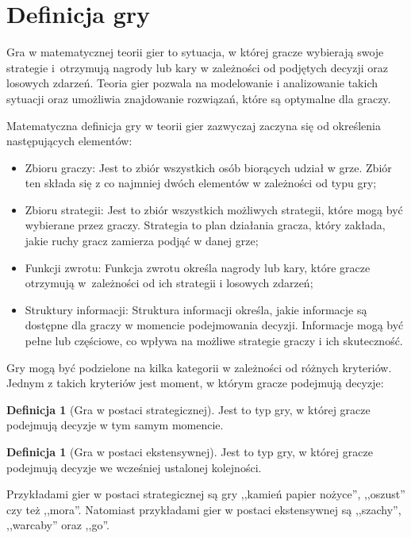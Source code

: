\documentclass[inzynierska]{pwr_wmat_praca_dyplomowa}
\theoremstyle{plain}
\numberwithin{theorem}{chapter}
\theoremstyle{definition}
\numberwithin{theorem}{chapter}
\newtheorem{definition}[theorem]{Definicja}
\begin{document}
\section{Definicja gry}
Gra w matematycznej teorii gier to sytuacja, w której gracze wybierają swoje strategie i~otrzymują nagrody lub kary w zależności od podjętych decyzji  oraz losowych zdarzeń. Teoria gier pozwala na modelowanie i analizowanie takich sytuacji oraz umożliwia znajdowanie rozwiązań, które są optymalne dla graczy.

Matematyczna definicja gry w teorii gier zazwyczaj zaczyna się od określenia następujących elementów:
\begin{itemize}
	\item Zbioru graczy: Jest to zbiór wszystkich osób biorących udział w grze. Zbiór ten składa się z co najmniej dwóch elementów w zależności od typu gry;
	
	\item Zbioru strategii: Jest to zbiór wszystkich możliwych strategii, które mogą być wybierane przez graczy. Strategia to plan działania gracza, który zakłada, jakie ruchy gracz zamierza podjąć w danej grze;
	
	\item Funkcji zwrotu: Funkcja zwrotu określa nagrody lub kary, które gracze otrzymują w~zależności od ich strategii i losowych zdarzeń;
	
	\item Struktury informacji: Struktura informacji określa, jakie informacje są dostępne dla graczy w momencie podejmowania decyzji. Informacje mogą być pełne lub częściowe, co wpływa na możliwe strategie graczy i ich skuteczność.
\end{itemize}

Gry mogą być podzielone na kilka kategorii w zależności od różnych kryteriów. Jednym z takich kryteriów jest moment, w którym gracze podejmują decyzje:

\begin{definition}[Gra w postaci strategicznej]
Jest to typ gry, w której gracze podejmują decyzje w tym samym
momencie.
\end{definition}
\begin{definition}[Gra w postaci ekstensywnej]
	Jest to typ gry, w której gracze podejmują decyzje we wcześniej ustalonej kolejności.
\end{definition}
\noindent
Przykładami gier w postaci strategicznej są gry ,,kamień papier nożyce'', ,,oszust'' czy też ,,mora''. Natomiast przykładami gier w postaci ekstensywnej są ,,szachy'', ,,warcaby'' oraz ,,go''.
\end{document}
